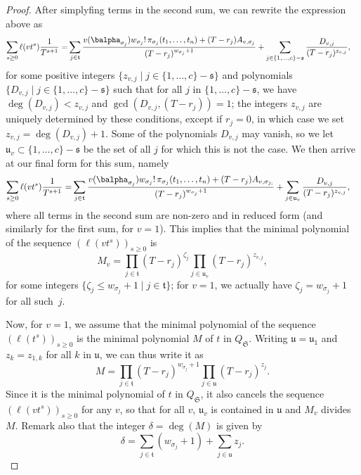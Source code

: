 \documentclass[12pt]{article}
\begin{document}
\begin{proof}
	After simplyfing terms in the second sum, we can rewrite the
	expression above as
	\begin{align*}
	\sum_{s \ge 0} \ell(v t^s)\frac{1}{T^{s+1}} =&
	\sum_{j \in \mathfrak{t}} \frac{
		v(\balpha_{\sigma_{j}})   w_{\sigma_{j}}!\, \pi_{{\sigma_{j}}}(t_1,\dots,t_n)
		+ (T-r_{j} )A_{v,\sigma_{j}}}
	{(T-r_{j} )^{w_{\sigma_{j}}+1}}  
	+\sum_{j \in  \{1,\dots,c\}-\mathfrak{s}}
	\frac{D_{v,j}}
	{(T-r_{j})^{z_{v,j}}},
	\end{align*}
	for some positive integers $\{z_{v,j} \mid j\in
	\{1,\dots,c\}-\mathfrak{s}\}$ and polynomials $\{D_{v,j} \mid j\in
	\{1,\dots,c\}-\mathfrak{s}\}$ such that for all $j$ in $
	\{1,\dots,c\}-\mathfrak{s}$, we have $\deg(D_{v,j}) < z_{v,j}$ and
	$\gcd(D_{v,j}, (T-r_{j} ))=1$; the integers $z_{v,j}$ are uniquely
	determined by these conditions, except if $r_{j}=0$, in which case we
	set $z_{v,j}=\deg(D_{v,j})+1$. Some of the polynomials $D_{v,j}$ may
	vanish, so we let $\mathfrak{u}_v \subset \{1,\dots,c\}-\mathfrak{s}$
	be the set of all $j$ for which this is not the case. 
	We then arrive at our final form for this sum, namely
	\begin{align}\label{eq:sumgenseries_collect1}
	\sum_{s \ge 0} \ell(v t^s) \frac{1}{T^{s+1}} =&
	\sum_{j \in \mathfrak{t}} \frac{
		v(\balpha_{\sigma_{j}})   w_{\sigma_{j}}!\, \pi_{{\sigma_{j}}}(t_1,\dots,t_n)
		+ (T-r_{j}  )A_{v,\sigma_{j;}}}
	{(T-r_{j} )^{w_{\sigma_{j}}+1}}  
	+\sum_{j \in  \mathfrak{u}_v}
	\frac{D_{v,j}}
	{(T-r_{j} )^{z_{v,j}}},
	\end{align}
	where all terms in the second sum are non-zero and in reduced form
	(and similarly for the first sum, for $v=1$).
	This implies that the minimal
	polynomial of the sequence $(\ell(vt^s))_{s \ge 0}$ is 
	$$M_v=\prod_{j \in \mathfrak{t}} (T-r_{j})^{\zeta_j} \prod_{j
		\in \mathfrak{u}_v} (T-r_{j})^{z_{v,j}},$$
	for some integers $\{\zeta_j \le w_{\sigma_{j}}+1 \mid j \in \mathfrak{t}\}$; for $v=1$, 
	we actually have $\zeta_j = w_{\sigma_{j}}+1$ for all such~$j$.
	
	Now, for $v=1$, we assume that the minimal polynomial of the sequence
	$(\ell(t^s))_{s \ge 0}$ is the minimal polynomial $M$ of $t$ in
	$Q_\mathfrak{S}$.  Writing $\mathfrak{u}=\mathfrak{u}_1$ and
	$z_k=z_{1,k}$ for all $k$ in $\mathfrak{u}$, we can thus write it as
	$$M=\prod_{j \in \mathfrak{t}} (T-r_{j})^{w_{\sigma_{j}}+1} \prod_{j
		\in \mathfrak{u}} (T-r_{j})^{z_{j}}.$$ Since it is the minimal
	polynomial of $t$ in $Q_\mathfrak{S}$, it also cancels the sequence
	$(\ell(v t^s))_{s \ge 0}$ for any $v$, so that for all $v$,
	$\mathfrak{u}_v$ is contained in $\mathfrak{u}$ and $M_v$ divides $M$.
	Remark also that the integer $\delta=\deg(M)$ is given by
	$$\delta=\sum_{j \in \mathfrak{t}} (w_{\sigma_j}+1)
	+\sum_{j\in\mathfrak{u}} z_{j}.$$ 
	

\end{proof}
\end{document}

